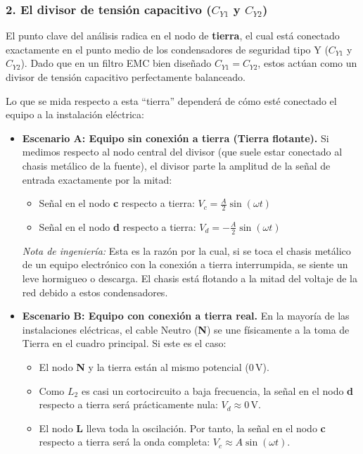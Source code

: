 \documentclass[12pt, a4paper]{article}
\begin{document}
\subsubsection*{2. El divisor de tensión capacitivo ($C_{Y1}$ y $C_{Y2}$)}
El punto clave del análisis radica en el nodo de \textbf{tierra}, el cual está conectado exactamente en el punto medio de los condensadores de seguridad tipo Y ($C_{Y1}$ y $C_{Y2}$). Dado que en un filtro EMC bien diseñado $C_{Y1} = C_{Y2}$, estos actúan como un divisor de tensión capacitivo perfectamente balanceado. 

Lo que se mida respecto a esta ``tierra'' dependerá de cómo esté conectado el equipo a la instalación eléctrica:

\begin{itemize}
    \item \textbf{Escenario A: Equipo sin conexión a tierra (Tierra flotante).} Si medimos respecto al nodo central del divisor (que suele estar conectado al chasis metálico de la fuente), el divisor parte la amplitud de la señal de entrada exactamente por la mitad:
    \begin{itemize}
        \item Señal en el nodo \textbf{c} respecto a tierra: $V_c = \frac{A}{2} \sin(\omega t)$
        \item Señal en el nodo \textbf{d} respecto a tierra: $V_d = -\frac{A}{2} \sin(\omega t)$
    \end{itemize}
    \textit{Nota de ingeniería:} Esta es la razón por la cual, si se toca el chasis metálico de un equipo electrónico con la conexión a tierra interrumpida, se siente un leve hormigueo o descarga. El chasis está flotando a la mitad del voltaje de la red debido a estos condensadores.

    \item \textbf{Escenario B: Equipo con conexión a tierra real.} En la mayoría de las instalaciones eléctricas, el cable Neutro (\textbf{N}) se une físicamente a la toma de Tierra en el cuadro principal. Si este es el caso:
    \begin{itemize}
        \item El nodo \textbf{N} y la tierra están al mismo potencial ($0\,\text{V}$).
        \item Como $L_2$ es casi un cortocircuito a baja frecuencia, la señal en el nodo \textbf{d} respecto a tierra será prácticamente nula: $V_d \approx 0\,\text{V}$.
        \item El nodo \textbf{L} lleva toda la oscilación. Por tanto, la señal en el nodo \textbf{c} respecto a tierra será la onda completa: $V_c \approx A \sin(\omega t)$.
    \end{itemize}
\end{itemize}
\end{document}
